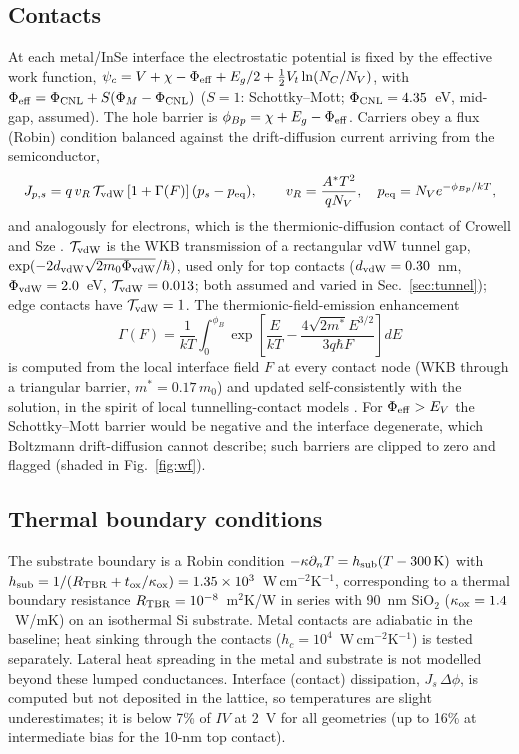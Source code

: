 \documentclass[11pt]{article}
\begin{document}
\subsection{Contacts}
At each metal/InSe interface the electrostatic potential is fixed by the effective work function, $\psi_c=V+\chi-\Phi_{\rm eff}+E_g/2+\tfrac{1}{2}V_t\ln(N_C/N_V)$, with $\Phi_{\rm eff}=\Phi_{\rm CNL}+S(\Phi_M-\Phi_{\rm CNL})$ ($S=1$: Schottky--Mott; $\Phi_{\rm CNL}=4.35$~eV, mid-gap, assumed). The hole barrier is $\phi_{Bp}=\chi+E_g-\Phi_{\rm eff}$. Carriers obey a flux (Robin) condition balanced against the drift-diffusion current arriving from the semiconductor,
\begin{equation}
J_{p,s}=q\,v_R\,\mathcal{T}_{\rm vdW}\,[1+\Gamma(F)]\,(p_s-p_{\rm eq}),\qquad v_R=\frac{A^*T^2}{qN_V},\quad p_{\rm eq}=N_V e^{-\phi_{Bp}/kT},
\label{eq:bc}
\end{equation}
and analogously for electrons, which is the thermionic-diffusion contact of Crowell and Sze \cite{refcrowell}. $\mathcal{T}_{\rm vdW}$ is the WKB transmission of a rectangular vdW tunnel gap, $\exp(-2d_{\rm vdW}\sqrt{2m_0\Phi_{\rm vdW}}/\hbar)$, used only for top contacts ($d_{\rm vdW}=0.30$~nm, $\Phi_{\rm vdW}=2.0$~eV, $\mathcal{T}_{\rm vdW}=0.013$; both assumed and varied in Sec.~\ref{sec:tunnel}); edge contacts have $\mathcal{T}_{\rm vdW}=1$. The thermionic-field-emission enhancement
\begin{equation}
\Gamma(F)=\frac{1}{kT}\int_0^{\phi_{B}}\exp\!\left[\frac{E}{kT}-\frac{4\sqrt{2m^*}E^{3/2}}{3q\hbar F}\right]dE
\end{equation}
is computed from the local interface field $F$ at every contact node (WKB through a triangular barrier, $m^*=0.17\,m_0$) and updated self-consistently with the solution, in the spirit of local tunnelling-contact models \cite{refieong,refpad}. For $\Phi_{\rm eff}>E_V$ the Schottky--Mott barrier would be negative and the interface degenerate, which Boltzmann drift-diffusion cannot describe; such barriers are clipped to zero and flagged (shaded in Fig.~\ref{fig:wf}).

\subsection{Thermal boundary conditions}
The substrate boundary is a Robin condition $-\kappa\partial_nT=h_{\rm sub}(T-300\,\mathrm{K})$ with $h_{\rm sub}=1/(R_{\rm TBR}+t_{\rm ox}/\kappa_{\rm ox})=1.35\times10^{3}$~W\,cm$^{-2}$K$^{-1}$, corresponding to a thermal boundary resistance $R_{\rm TBR}=10^{-8}$~m$^2$K/W in series with 90~nm SiO$_2$ ($\kappa_{\rm ox}=1.4$~W/mK) on an isothermal Si substrate. Metal contacts are adiabatic in the baseline; heat sinking through the contacts ($h_c=10^4$~W\,cm$^{-2}$K$^{-1}$) is tested separately. Lateral heat spreading in the metal and substrate is not modelled beyond these lumped conductances. Interface (contact) dissipation, $J_{s}\,\Delta\phi$, is computed but not deposited in the lattice, so temperatures are slight underestimates; it is below 7\% of $IV$ at 2~V for all geometries (up to 16\% at intermediate bias for the 10-nm top contact).
\end{document}

